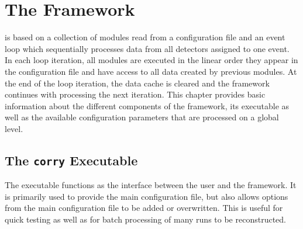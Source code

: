 \chapter{The \corrybold Framework}
\label{ch:framework}

\corry  is based on a collection of modules read from a configuration file and an event loop which sequentially processes data from all detectors assigned to one event.
In each loop iteration, all modules are executed in the linear order they appear in the configuration file and have access to all data created by previous modules.
At the end of the loop iteration, the data cache is cleared and the framework continues with processing the next iteration.
This chapter provides basic information about the different components of the framework, its executable as well as the available configuration parameters that are processed on a global level.

\section{The \texttt{corry} Executable}
\label{sec:executable}
The \corry executable  functions as the interface between the user and the framework.
It is primarily used to provide the main configuration file, but also allows options from the main configuration file to be added or overwritten.
This is useful for quick testing as well as for batch processing of many runs to be reconstructed.

